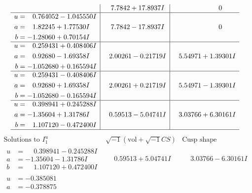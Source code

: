 \documentclass[1p]{elsarticle_modified}
\theoremstyle{definition}
\newcommand{\I}{\sqrt{-1}}
\begin{document}
$$\begin{array}{c|c|c}
 & \phantom{-}7.7842 + 17.8937 I & \phantom{-0.000000 } 0 \\ \hline\begin{aligned}
u &= \phantom{-}0.764052 - 1.045550 I \\
a &= \phantom{-}1.82245 + 1.77530 I \\
b &= -1.28060 + 0.70154 I\end{aligned}
 & \phantom{-}7.7842 - 17.8937 I & \phantom{-0.000000 } 0 \\ \hline\begin{aligned}
u &= \phantom{-}0.259431 + 0.408406 I \\
a &= \phantom{-}0.92680 - 1.69358 I \\
b &= -1.052680 + 0.165594 I\end{aligned}
 & \phantom{-}2.00261 - 0.21719 I & \phantom{-}5.54971 + 1.39301 I \\ \hline\begin{aligned}
u &= \phantom{-}0.259431 - 0.408406 I \\
a &= \phantom{-}0.92680 + 1.69358 I \\
b &= -1.052680 - 0.165594 I\end{aligned}
 & \phantom{-}2.00261 + 0.21719 I & \phantom{-}5.54971 - 1.39301 I \\ \hline\begin{aligned}
u &= \phantom{-}0.398941 + 0.245288 I \\
a &= -1.35604 + 1.31786 I \\
b &= \phantom{-}1.107120 - 0.472400 I\end{aligned}
 & \phantom{-}0.59513 - 5.04741 I & \phantom{-}3.03766 + 6.30161 I\\
 \hline 
 \end{array}$$\newpage$$\begin{array}{c|c|c}  
\text{Solutions to }I^u_{1}& \I (\text{vol} + \sqrt{-1}CS) & \text{Cusp shape}\\
 \hline 
\begin{aligned}
u &= \phantom{-}0.398941 - 0.245288 I \\
a &= -1.35604 - 1.31786 I \\
b &= \phantom{-}1.107120 + 0.472400 I\end{aligned}
 & \phantom{-}0.59513 + 5.04741 I & \phantom{-}3.03766 - 6.30161 I \\ \hline\begin{aligned}
u &= -0.385081\phantom{ +0.000000I} \\
a &= -0.378875\phantom{ +0.000000I} \\

\end{aligned}
\end{array}$$
\end{document}
